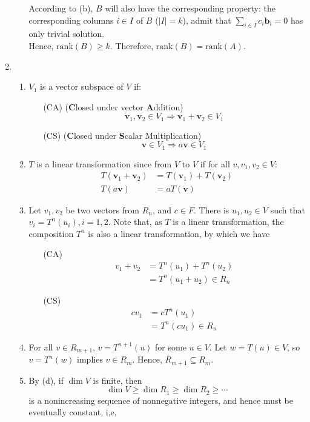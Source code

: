 \documentclass[12pt]{article}
\newcommand{\rank}{\mathrm{rank}}
\theoremstyle{definition}
\begin{document}
\begin{enumerate}
\begin{enumerate}
According to (b), $B$ will also have the corresponding property: the corresponding columns $i\in I$ of $B$ ($|I|=k$), admit that $\sum_{i\in I}c_i\mathbf{b}_i=0$ has only trivial solution.\\
Hence, $\rank(B)\geq k$. Therefore, $\rank(B)=\rank(A)$.
\end{enumerate}
\item \begin{enumerate}
\item $V_1$ is a vector subspace of $V$ if:
\begin{itemize}
\item[(CA)] (\textbf{C}losed under vector \textbf{A}ddition) 
\[
 \mathbf{v}_1,\mathbf{v}_2\in V_1\Rightarrow \mathbf{v}_1+\mathbf{v}_2\in V_1
\]
\item[(CS)] (\textbf{C}losed under \textbf{S}calar Multiplication)
\[
\mathbf{v}\in V_1\Rightarrow a\mathbf{v}\in V_1
\] 
\end{itemize}
\item $T$ is a linear transformation since from $V$ to $V$ if for all $v,v_1,v_2\in V$:
\begin{align*}
T(\mathbf{v}_1+\mathbf{v}_2)&=T(\mathbf{v}_1)+T(\mathbf{v}_2)\\
T(a\mathbf{v})&=aT(\mathbf{v})
\end{align*}
\item Let $v_1, v_2$ be two vectors from $R_n$, and $c\in F$. There is $u_1, u_2\in V$ such that $v_i = T^n(u_i), i=1,2$. Note that, as $T$ is a linear transformation, the composition $T^n$ is also a linear transformation, by which we have
\begin{itemize}
  \item[(CA)] 
  \begin{align*}
  v_1+v_2&=T^n(u_1)+T^n(u_2)\\
  &=T^n(u_1+u_2)\in R_n
  \end{align*}
  \item[(CS)]
  \begin{align*}
  cv_1&=cT^n(u_1)\\
    &=T^n(cu_1)\in R_n
    \end{align*}
  \end{itemize}
  \item For all $v\in R_{m+1}$, $v=T^{n+1}(u)$ for some $u\in V$. Let $w=T(u)\in V$, so $v=T^n(w)$ implies $v\in R_m$. Hence, $R_{m+1}\subseteq R_m$.
  \item By (d), if $\dim V$ is finite, then 
  \[
\dim V \geq \dim R_1\geq \dim R_2\geq \cdots
  \]
  is a nonincreasing sequence of nonnegative integers, and hence must be eventually constant, i,e,

\end{enumerate}
\end{enumerate}
\end{document}
